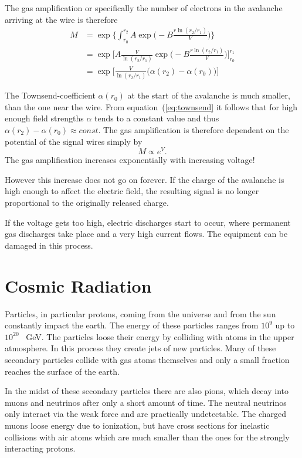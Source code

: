 \documentclass[12pt]{article}
\begin{document}
The gas amplification or specifically the number of electrons in the avalanche arriving at the wire is therefore
\begin{align*}
M &= \exp \Biggl\{ \int_{r_0}^{r_2} A \exp \Biggl( - B \frac{r \ln(r_2/r_1)}{V}\Biggr)\Biggr\} \\
&= \exp \Biggl[ A \frac{V}{\ln(r_2/r_1)} \exp \Biggl( - B \frac{r \ln(r_2/r_1)}{V} \Biggr) \Biggr]_{r_0}^{r_1} \\
& = \exp \Biggl[ \frac{V}{\ln(r_2/r_1)} \bigl(\alpha(r_2) - \alpha (r_0)\bigr) \Biggr]
\end{align*}

The Townsend-coefficient $\alpha(r_0)$ at the start of the avalanche is much smaller, than the one near the wire. From equation~(\ref{eq:townsend} it follows that for high enough field strengths $\alpha$ tends to a constant value and thus $\alpha(r_2) - \alpha(r_0) \approx const.$ The gas amplification is therefore  dependent on the potential of the signal wires simply by
\begin{equation}
M \propto e^V.
\end{equation}
The gas amplification increases exponentially with increasing voltage!

However this increase does not go on forever. If the charge of the  avalanche is high enough to affect the electric field, the resulting signal is no longer proportional to the originally released charge.

If the voltage gets too high, electric discharges start to occur, where permanent gas discharges take place and a very high current flows. The equipment can be damaged in this process. 

\section{Cosmic Radiation}

Particles, in particular protons, coming from the universe and from the sun constantly impact the earth. The energy of these particles ranges from $10^9$ up to $10^{20}$ \SI{}{\giga\electronvolt}. The particles loose their energy by colliding with atoms in the upper atmosphere. In this process they create jets of new particles. Many of these secondary particles collide with gas atoms themselves and only a small fraction reaches the surface of the earth.

 In the midst of these secondary particles there are also pions, which decay into muons and neutrinos after only a short amount of time. The neutral neutrinos only interact via the weak force and are practically undetectable. The charged muons loose energy due to ionization, but have cross sections for inelastic collisions with air atoms which are much smaller than the ones for the strongly interacting protons.
\end{document}
